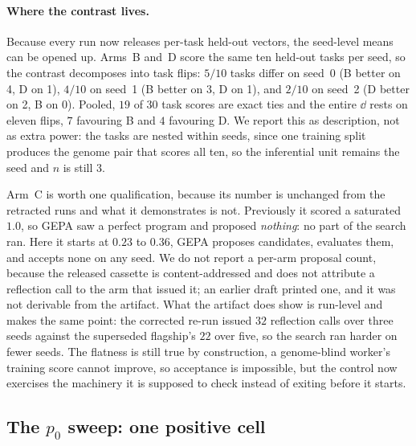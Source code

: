 \documentclass[11pt]{article}
\begin{document}
\paragraph{Where the contrast lives.}
Because every run now releases per-task held-out vectors, the seed-level means can be opened
up. Arms~B and~D score the same ten held-out tasks per seed, so the contrast decomposes into
task flips: $5/10$ tasks differ on seed~0 (B better on 4, D on 1), $4/10$ on seed~1 (B better
on 3, D on 1), and $2/10$ on seed~2 (D better on 2, B on 0). Pooled, $19$ of $30$ task scores
are exact ties and the entire $\dd$ rests on eleven flips, $7$ favouring B and $4$ favouring
D. We report this as description, not as extra power: the tasks
are nested within seeds, since one training split produces the genome pair that scores all
ten, so the inferential unit remains the seed and $n$ is still $3$.

Arm~C is worth one qualification, because its number is unchanged from the retracted runs and
what it demonstrates is not. Previously it scored a saturated $1.0$, so GEPA saw a perfect
program and proposed \emph{nothing}: no part of the search ran. Here it starts at $0.23$ to
$0.36$, GEPA proposes candidates, evaluates them, and accepts none on any seed. We do not report
a per-arm proposal count, because the released cassette is content-addressed and does not
attribute a reflection call to the arm that issued it; an earlier draft printed one, and it was
not derivable from the artifact. What the artifact does show is run-level and makes the same
point: the corrected re-run issued $32$ reflection calls over three seeds against the superseded
flagship's $22$ over five, so the search ran harder on fewer seeds. The
flatness
is still true by construction, a genome-blind worker's training score cannot improve, so
acceptance is impossible, but the control now exercises the machinery it is supposed to
check instead of exiting before it starts.

\subsection{The \texorpdfstring{$p_0$}{p0} sweep: one positive cell}
\label{sec:p0}
\end{document}
